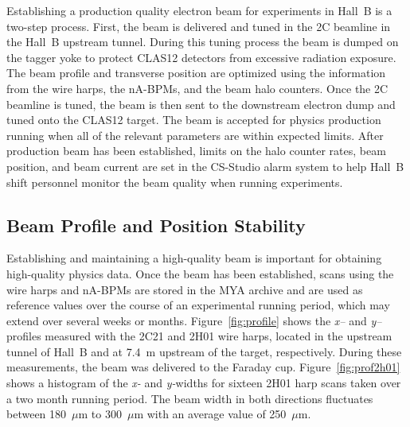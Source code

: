 Establishing a production quality electron beam for experiments in Hall~B is a two-step process. First, the beam is
delivered and tuned in the 2C beamline in the Hall~B upstream tunnel. During this tuning process the beam is dumped
on the tagger yoke to protect CLAS12 detectors from excessive radiation exposure. 
The beam profile and transverse position are optimized using the information from the wire harps, the nA-BPMs, and
the beam halo counters. Once the 2C beamline is tuned,
the beam is then sent to the downstream electron dump and tuned onto the CLAS12 target. The beam is accepted for physics production running when all of the relevant parameters are within expected limits. After production beam has been established,  limits on the halo counter rates, beam position,
and beam current are set in the CS-Studio alarm system to help Hall~B shift personnel monitor the beam quality
when running experiments.  

\subsection{Beam Profile and Position Stability}

Establishing and maintaining a high-quality beam is important for obtaining high-quality physics data. Once the beam
has been established, scans using the wire harps and nA-BPMs are stored in the MYA archive and are used as
reference values over the course of an experimental running period, which may extend over several weeks or months.
Figure~\ref{fig:profile}  shows the {\it x--} and {\it y--}profiles measured with the 2C21 and 2H01 wire harps,
located in the upstream tunnel of Hall~B and at 7.4~m upstream of the target, respectively. During these
measurements, the beam was delivered to the Faraday cup. Figure~\ref{fig:prof2h01} shows a histogram of the
{\it x-} and {\it y-}widths for sixteen 2H01 harp scans taken over a two month running period.  The beam width in
both directions fluctuates between 180~$\mu$m to 300~$\mu$m with an average value of 250~$\mu$m. 

